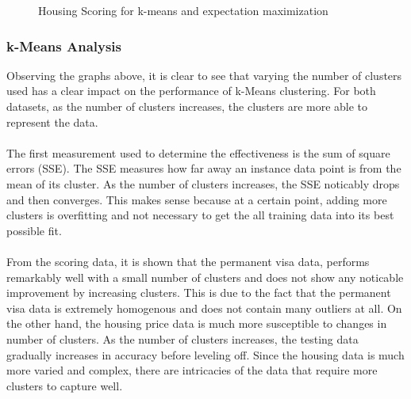 \documentclass[h]{article}
\begin{document}
\begin{figure}[H]
      \caption*{Housing Scoring for k-means and expectation maximization} 
   \endminipage\hfill
\end{figure}

\subsubsection*{k-Means Analysis}
Observing the graphs above, it is clear to see that varying the number of clusters used 
has a clear impact on the performance of k-Means clustering.  For both datasets, as the number of 
clusters increases, the clusters are more able to represent the data. 
\\ \\
The first measurement used to determine the effectiveness is the sum of square 
errors (SSE).  The SSE measures how far away an instance data point is from the mean of its cluster.
As the number of clusters increases, the SSE noticably drops and then converges.  This 
makes sense because at a certain point, adding more clusters is overfitting and 
not necessary to get the all training data into its best possible fit.
\\ \\ 
From the scoring data, it is shown that the permanent visa data, performs remarkably well with a small number of 
clusters and does not show any noticable improvement by increasing clusters.  
This is due to the fact that the permanent visa data is extremely homogenous and 
does not contain many outliers at all.   On the other hand, the housing price 
data is much more susceptible to changes in number of clusters.  As the number 
of clusters increases, the testing data gradually increases in accuracy before leveling off.  
Since the housing data is much more varied and complex, there are intricacies of 
the data that require more clusters to capture well.
\end{document}
